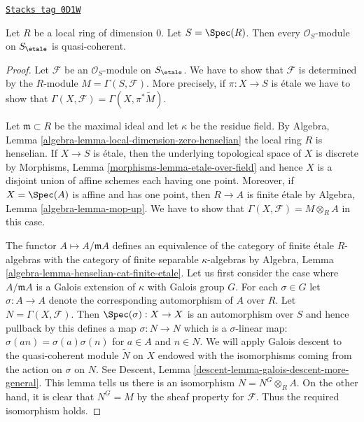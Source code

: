 \begin{lemma}
\label{etale-cohomology-lemma-all-modules-quasi-coherent}
\href{https://stacks.math.columbia.edu/tag/0D1W}{\texttt{Stacks tag 0D1W}}

Let $R$ be a local ring of dimension $0$. Let $S = \Spec(R)$.
Then every $\mathcal{O}_S$-module on $S_\etale$ is quasi-coherent.
\end{lemma}

\begin{proof}
Let $\mathcal{F}$ be an $\mathcal{O}_S$-module on $S_\etale$.
We have to show that $\mathcal{F}$ is determined by the
$R$-module $M = \Gamma(S, \mathcal{F})$.
More precisely, if $\pi : X \to S$ is \'etale we have to
show that $\Gamma(X, \mathcal{F}) = \Gamma(X, \pi^*\widetilde{M})$.

\medskip\noindent
Let $\mathfrak m \subset R$ be the maximal ideal and let
$\kappa$ be the residue field. By
Algebra, Lemma \ref{algebra-lemma-local-dimension-zero-henselian}
the local ring $R$ is henselian. If $X \to S$ is \'etale,
then the underlying topological space of $X$ is discrete
by Morphisms, Lemma \ref{morphisms-lemma-etale-over-field}
and hence $X$ is a disjoint union of affine schemes
each having one point. Moreover, if $X = \Spec(A)$ is affine and
has one point, then $R \to A$ is finite \'etale by
Algebra, Lemma \ref{algebra-lemma-mop-up}.
We have to show that $\Gamma(X, \mathcal{F}) = M \otimes_R A$
in this case.

\medskip\noindent
The functor $A \mapsto A/\mathfrak m A$ defines an equivalence of
the category of finite \'etale $R$-algebras
with the category of finite separable $\kappa$-algebras by
Algebra, Lemma \ref{algebra-lemma-henselian-cat-finite-etale}.
Let us first consider the case where $A/\mathfrak m A$
is a Galois extension of $\kappa$ with Galois group $G$.
For each $\sigma \in G$ let $\sigma : A \to A$ denote the
corresponding automorphism of $A$ over $R$.
Let $N = \Gamma(X, \mathcal{F})$.
Then $\Spec(\sigma) : X \to X$ is an automorphism over $S$
and hence pullback by this defines a map $\sigma : N \to N$
which is a $\sigma$-linear map: $\sigma(an) = \sigma(a) \sigma(n)$
for $a \in A$ and $n \in N$.
We will apply Galois descent to the quasi-coherent module
$\widetilde{N}$ on $X$ endowed with the isomorphisms
coming from the action on $\sigma$ on $N$. See Descent, Lemma
\ref{descent-lemma-galois-descent-more-general}.
This lemma tells us there is an isomorphism $N = N^G \otimes_R A$.
On the other hand, it is clear that $N^G = M$ by the sheaf property
for $\mathcal{F}$. Thus the required isomorphism holds.


\end{proof}
